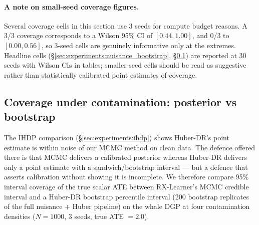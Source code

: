 \paragraph{A note on small-seed coverage figures.}
Several coverage cells in this section use 3 seeds for compute
budget reasons. A 3/3 coverage corresponds to a Wilson 95\% CI of
$[0.44, 1.00]$, and 0/3 to $[0.00, 0.56]$, so 3-seed cells are
genuinely informative only at the extremes. Headline cells
(\S\ref{sec:experiments:nuisance_bootstrap},
\S\ref{sec:experiments:coverage}) are reported at 30 seeds with
Wilson CIs in tables; smaller-seed cells should be read as
suggestive rather than statistically calibrated point estimates of
coverage.

\subsection{Coverage under contamination: posterior vs bootstrap}
\label{sec:experiments:coverage}
The IHDP comparison (\S\ref{sec:experiments:ihdp}) shows
Huber-DR's point estimate is within noise of our MCMC method on
clean data. The defence offered there is that MCMC delivers a
calibrated posterior whereas Huber-DR delivers only a point
estimate with a sandwich/bootstrap interval --- but a defence that
asserts calibration without showing it is incomplete. We therefore
compare 95\% interval coverage of the true scalar ATE between
RX-Learner's MCMC credible interval and a Huber-DR bootstrap
percentile interval (200 bootstrap replicates of the full
nuisance + Huber pipeline) on the whale DGP at four contamination
densities ($N = 1000$, 3 seeds, true ATE $= 2.0$).

